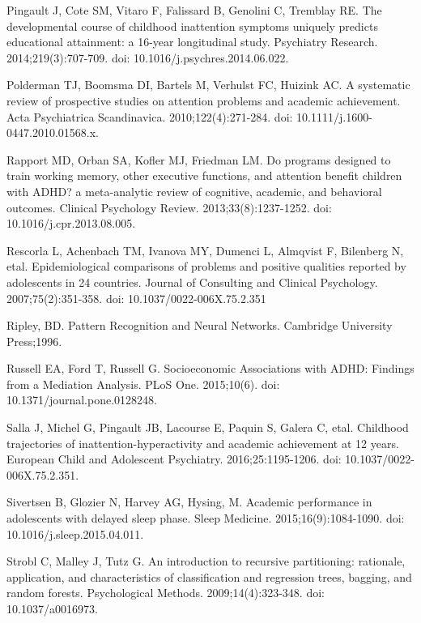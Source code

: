\documentclass[10pt,letterpaper]{article}
\begin{document}
{{\begin{thebibliography}{10}
Pingault J, Cote SM, Vitaro F, Falissard B,
Genolini C, Tremblay RE.
\newblock The developmental course of childhood inattention symptoms uniquely
  predicts educational attainment: a 16-year longitudinal study.
\newblock Psychiatry Research. 2014;219(3):707-709. doi: 10.1016/j.psychres.2014.06.022.

Polderman TJ, Boomsma DI, Bartels M, Verhulst FC, Huizink AC.
\newblock A systematic review of prospective studies on attention problems and
  academic achievement.
\newblock Acta Psychiatrica Scandinavica. 2010;122(4):271-284. doi: 10.1111/j.1600-0447.2010.01568.x.

Rapport MD, Orban SA, Kofler MJ, Friedman LM.
\newblock Do programs designed to train working memory, other executive
  functions, and attention benefit children with {ADHD}? a meta-analytic review
  of cognitive, academic, and behavioral outcomes.
\newblock Clinical Psychology Review. 2013;33(8):1237-1252. doi: 10.1016/j.cpr.2013.08.005.

Rescorla L, Achenbach TM, Ivanova MY, Dumenci L, 
  Almqvist F, Bilenberg N, etal. 
\newblock Epidemiological comparisons of problems and positive qualities
  reported by adolescents in 24 countries.
\newblock Journal of Consulting and Clinical Psychology. 2007;75(2):351-358. doi: 10.1037/0022-006X.75.2.351

Ripley, BD.
\newblock Pattern Recognition and Neural Networks.
\newblock Cambridge University Press;1996.

Russell EA, Ford T, Russell G.
\newblock Socioeconomic Associations with ADHD: Findings from a Mediation Analysis.
\newblock PLoS One. 2015;10(6). doi: 10.1371/journal.pone.0128248. 

Salla J, Michel G, Pingault JB, Lacourse E, 
  Paquin S, Galera C, etal. 
\newblock Childhood trajectories of inattention-hyperactivity and academic
  achievement at 12 years.
\newblock European Child and Adolescent Psychiatry. 2016;25:1195-1206. doi: 10.1037/0022-006X.75.2.351.

Sivertsen B, Glozier N, Harvey AG, Hysing, M.
\newblock Academic performance in adolescents with delayed sleep phase.
\newblock Sleep Medicine. 2015;16(9):1084-1090. doi: 10.1016/j.sleep.2015.04.011.

Strobl C, Malley J, Tutz G.
\newblock An introduction to recursive partitioning: rationale, application,
  and characteristics of classification and regression trees, bagging, and
  random forests.
\newblock Psychological Methods. 2009;14(4):323-348. doi: 10.1037/a0016973.


\end{thebibliography}}}
\end{document}
